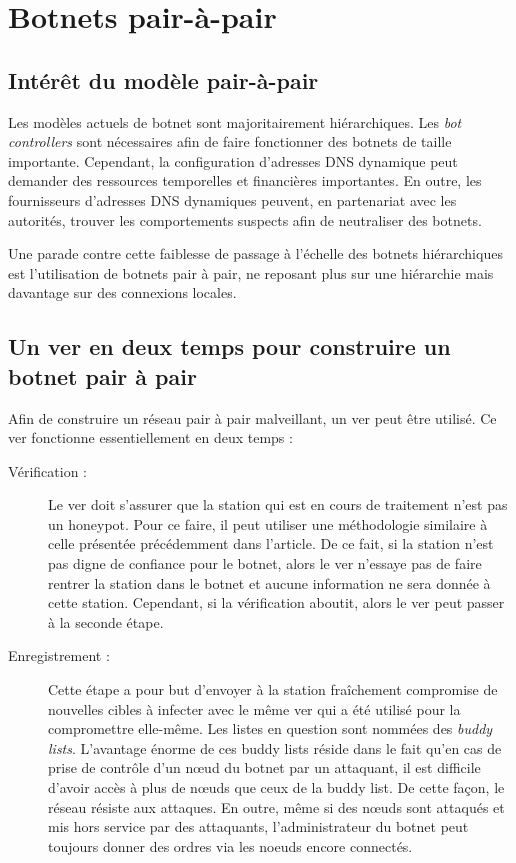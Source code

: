 \section{Botnets pair-à-pair}

\subsection{Intérêt du modèle pair-à-pair}

Les modèles actuels de botnet sont majoritairement hiérarchiques. Les
\textit{bot controllers} sont nécessaires afin de faire fonctionner des botnets
de taille importante. Cependant, la configuration d'adresses DNS
dynamique peut demander des ressources temporelles et financières importantes. En
outre, les fournisseurs d'adresses DNS dynamiques peuvent, en partenariat avec
les autorités, trouver les comportements suspects afin de neutraliser des
botnets.

Une parade contre cette faiblesse de passage à l'échelle des botnets
hiérarchiques est l'utilisation de botnets pair à pair, ne reposant plus sur une
hiérarchie mais davantage sur des connexions locales.


\subsection{Un ver en deux temps pour construire un botnet pair à pair}

Afin de construire un réseau pair à pair malveillant, un ver peut être utilisé.
Ce ver fonctionne essentiellement en deux temps :

\begin{description}

\item[Vérification :] Le ver doit s'assurer que la station qui est en cours de
	traitement n'est pas un honeypot. Pour ce faire, il peut utiliser une
	méthodologie similaire à celle présentée précédemment dans l'article. De
	ce fait, si la station n'est pas digne de confiance pour le botnet, alors
	le ver n'essaye pas de faire rentrer la station dans le botnet et aucune
	information ne sera donnée à cette station. Cependant, si la vérification
	aboutit, alors le ver peut passer à la seconde étape.

\item[Enregistrement :] Cette étape a pour but d'envoyer à la station
	fraîchement compromise de nouvelles cibles à infecter avec le même ver
	qui a été utilisé pour la compromettre elle-même. Les listes en question
	sont nommées des \textit{buddy lists}. L'avantage énorme de ces buddy
	lists réside dans le fait qu'en cas de prise de contrôle d'un nœud du
	botnet par un attaquant, il est difficile d'avoir accès à plus de nœuds
	que ceux de la buddy list. De cette façon, le réseau résiste aux
	attaques. En outre, même si des nœuds sont attaqués et mis hors
	service par des attaquants, l'administrateur du botnet peut toujours
	donner des ordres via les noeuds encore connectés.

\end{description}

